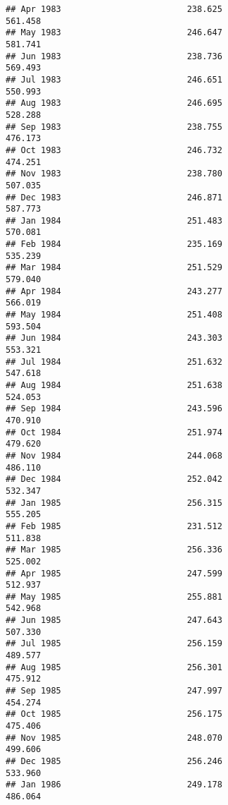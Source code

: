 \documentclass[
]{article}
\begin{document}
\begin{verbatim}
## Apr 1983                         238.625                           561.458
## May 1983                         246.647                           581.741
## Jun 1983                         238.736                           569.493
## Jul 1983                         246.651                           550.993
## Aug 1983                         246.695                           528.288
## Sep 1983                         238.755                           476.173
## Oct 1983                         246.732                           474.251
## Nov 1983                         238.780                           507.035
## Dec 1983                         246.871                           587.773
## Jan 1984                         251.483                           570.081
## Feb 1984                         235.169                           535.239
## Mar 1984                         251.529                           579.040
## Apr 1984                         243.277                           566.019
## May 1984                         251.408                           593.504
## Jun 1984                         243.303                           553.321
## Jul 1984                         251.632                           547.618
## Aug 1984                         251.638                           524.053
## Sep 1984                         243.596                           470.910
## Oct 1984                         251.974                           479.620
## Nov 1984                         244.068                           486.110
## Dec 1984                         252.042                           532.347
## Jan 1985                         256.315                           555.205
## Feb 1985                         231.512                           511.838
## Mar 1985                         256.336                           525.002
## Apr 1985                         247.599                           512.937
## May 1985                         255.881                           542.968
## Jun 1985                         247.643                           507.330
## Jul 1985                         256.159                           489.577
## Aug 1985                         256.301                           475.912
## Sep 1985                         247.997                           454.274
## Oct 1985                         256.175                           475.406
## Nov 1985                         248.070                           499.606
## Dec 1985                         256.246                           533.960
## Jan 1986                         249.178                           486.064

\end{verbatim}
\end{document}
